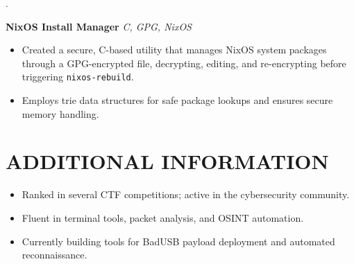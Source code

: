 .\documentclass[11pt]{article}
\begin{document}
\textbf{NixOS Install Manager} \hfill \textit{C, GPG, NixOS} \\
\begin{itemize}[leftmargin=*, nosep]
  \item Created a secure, C-based utility that manages NixOS system packages through a GPG-encrypted file, decrypting, editing, and re-encrypting before triggering \texttt{nixos-rebuild}.
  \item Employs trie data structures for safe package lookups and ensures secure memory handling.
\end{itemize}

\section*{ADDITIONAL INFORMATION}
\begin{itemize}[leftmargin=*, nosep]
  \item Ranked in several CTF competitions; active in the cybersecurity community.
  \item Fluent in terminal tools, packet analysis, and OSINT automation.
  \item Currently building tools for BadUSB payload deployment and automated reconnaissance.
\end{itemize}
\end{document}
